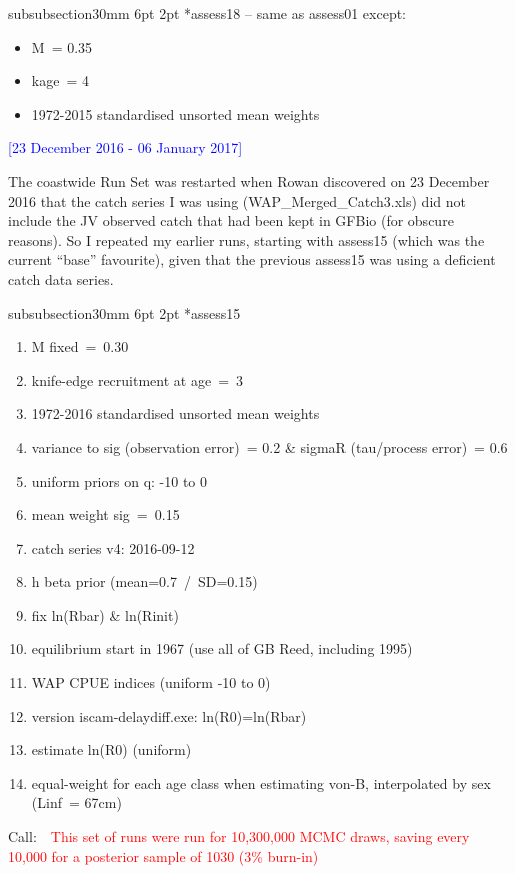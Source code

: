 \documentclass[11pt]{book}
\makeatletter
\newcommand{\red}[1]{{\textcolor{red} {#1}}}
\newcommand{\blue}[1]{{\textcolor{blue} {#1}}}
\renewcommand{\subsubsection}{\@startsection%
{subsubsection}{3}{0mm}%
{6pt \@plus -0pt \@minus -0pt}{2pt \@plus 0pt}%
{\normalfont\bf}}%
\newcommand\call[1]{
\footnotesize\selectfont\hangindent=0.35in
Call:~~\red{#1}
\normalsize\selectfont}
\makeatother
\begin{document}
\subsubsection*{assess18 -- same as assess01 except:}
\begin{itemize}[nosep]
  \item M~= 0.35
  \item kage~= 4
  \item 1972-2015 standardised unsorted mean weights
\end{itemize}

\bigskip

\blue{[23 December 2016 - 06 January 2017]}

The coastwide Run Set was restarted when Rowan discovered on 23 December 2016 that the catch series I was using (WAP\_Merged\_Catch3.xls) did not include the JV observed catch that had been kept in GFBio (for obscure reasons).
So I repeated my earlier runs, starting with assess15 (which was the current ``base'' favourite), given that the previous assess15 was using a deficient catch data series.

\subsubsection*{assess15}
\begin{enumerate}[nosep]
  \item M fixed~=~0.30
  \item knife-edge recruitment at age~=~3
  \item 1972-2016 standardised unsorted mean weights
  \item variance to sig (observation error)~= 0.2 \& sigmaR (tau/process error)~= 0.6
  \item uniform priors on q: -10 to 0
  \item mean weight sig~=~0.15
  \item catch series v4: 2016-09-12
  \item h beta prior (mean=0.7~/~SD=0.15)
  \item fix ln(Rbar) \& ln(Rinit)
  \item equilibrium start in 1967 (use all of GB Reed, including 1995)
  \item WAP CPUE indices (uniform -10 to 0)
  \item version iscam-delaydiff.exe: ln(R0)=ln(Rbar)
  \item estimate ln(R0) (uniform)
  \item equal-weight for each age class when estimating von-B, interpolated by sex (Linf~= 67cm)
\end{enumerate}
\call{This set of runs were run for 10,300,000 MCMC draws, saving every 10,000 for a posterior sample of 1030 (3\% burn-in)}
\end{document}
